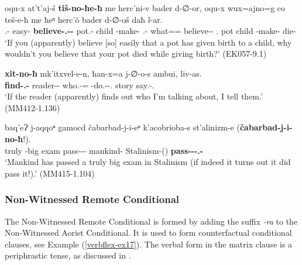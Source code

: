 \begin{exe}
	\ex\label{verbflex-ex16}
	\begin{xlist}
		
		\ex\label{verbflex-ex16a}
		\gll oqu-x at't'aj-š \textbf{tiš-no-ħe-ħ} me herc'ni-v bader d-∅-or, oqu-x wux=ajno=g co teš-e-ħ me ħeⁿ herc'\u{o} bader d-∅-oš daħ l-ar.  \\
		{\Dist}.{\Obl}-{\Cont} easy-{\Adv} \textbf{believe-{\Nw}.{\Aor}-{\Cond}-{\Ssg}} {\Subord} pot.{\Obl}-{\Erg} child {\D}-make-{\Imprf} {\Dist}.{\Obl}-{\Cont} what={\Ben}={\Indf} {\Neg} believe-{\Npst}-{\Ssg} {\Subord} {\Ssg}.{\Gen} pot child {\D}-make-{\Simul} {\Pv} die-{\Imprf} \\
		\trans `If you (apparently) believe [so] easily that a pot has given birth to a child, why wouldn't you believe that your pot died while giving birth?'
		\hfill (EK057-9.1)
		
		\ex\label{verbflex-ex16b}
		\gll  \textbf{xit-no-ħ} mk'itxvel-e-n, ħan-x=a j-∅-o-s ambui, liv-as. \\
		\textbf{find-{\Nw}.{\Aor}-{\Cond}} reader-{\Obl}-{\Dat} who.{\Obl}-{\Cont}={\Emph} {\J}-do.{\Pfv}-{\Npst}-{\Fsg}.{\Erg} story say.{\Ipfv}-{\Fsg}.{\Erg} \\
		\trans `If the reader (apparently) finds out who I'm talking about, I tell them.' \\
		\hfill (MM412-1.136)
		
		\ex\label{verbflex-ex16c}
		\gll baq'eɁ j-aqqoⁿ gamocd čabarbad-j-i-eⁿ k'acobrioba-s st'alinizm-e (\textbf{čabarbad-j-i-no-ħ}!). \\
		truly {\J}-big exam pass-{\J}-{\Tr}-{\Aor} mankind-{\Erg} Stalinism-{\Obl}({\Ess}) \textbf{pass-{\J}-{\Tr}-{\Nw}.{\Aor}-{\Cond}}\\
		\trans `Mankind has passed a truly big exam in Stalinism (if indeed it turns out it did pass it!).'
		\hfill (MM415-1.104)
		
	\end{xlist}
\end{exe}

\subsubsection{Non-Witnessed Remote Conditional}

The Non-Witnessed Remote Conditional is formed by adding the suffix \textit{-ra} to the Non-Witnessed Aorist Conditional. It is used to form counterfactual conditional clauses, see Example (\ref{verbflex-ex17}). The verbal form in the matrix clause is a periphrastic tense, as discussed in .


